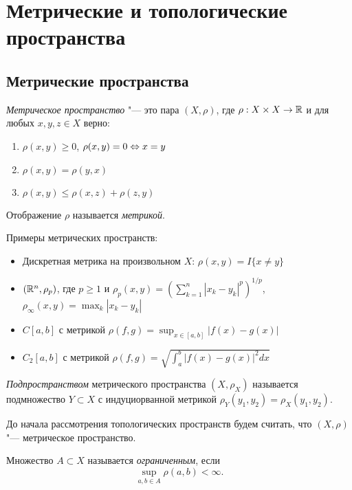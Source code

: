 \documentclass[main]{subfiles}
\begin{document}
\section{Метрические и топологические пространства}
\subsection{Метрические пространства}

\begin{definition}
  \emph{Метрическое пространство} "--- это
  пара \( (X, \rho) \), где \( \rho : X \times X \to \mathbb{R} \) и
  для любых \( x, y, z \in X \) верно:
  \begin{enumerate}
    \item \( \rho(x, y) \ge 0 \), \( \rho(x, y) = 0 \Leftrightarrow x = y \)
    \item \( \rho(x, y) = \rho(y, x) \)
    \item \( \rho(x, y) \le \rho(x, z) + \rho(z, y) \)
  \end{enumerate}
  Отображение \( \rho \) называется \emph{метрикой}.
\end{definition}

Примеры метрических пространств:
\begin{itemize}
  \item Дискретная метрика на произвольном \( X \):
    \( \rho(x, y) = I\{ x \ne y \} \)
  \item 
    \( (\mathbb{R}^n, \rho_p) \), где \( p \ge 1 \) и
    \( \rho_p(x, y) = \left( \sum_{k=1}^{n}
    |x_k - y_k|^p \right)^{1/p} \),
    \( \rho_\infty(x, y) = \max_k |x_k - y_k| \)
  \item 
    \( C[a, b] \) с метрикой
    \( \rho(f, g) = \sup_{x \in [a, b]} |f(x) - g(x)| \)
  \item \( C_2[a, b] \) с метрикой
    \( \rho(f, g) = \sqrt{\int_a^b |f(x) - g(x)|^2 dx} \)
\end{itemize}

\begin{definition}
  \emph{Подпространством} метрического пространства \( (X, \rho_X) \)
  называется подмножество \( Y \subset X \) с индуциорванной метрикой
  \( \rho_Y(y_1, y_2) = \rho_X(y_1, y_2) \).
\end{definition}

До начала рассмотрения топологических пространств будем считать,
что \( (X, \rho) \) "--- метрическое пространство.
  
\begin{definition}
  Множество \( A \subset X \) называется \emph{ограниченным},
  если
  \[ \sup_{a, b \in A} \rho(a, b) < \infty. \]
\end{definition}
\end{document}
